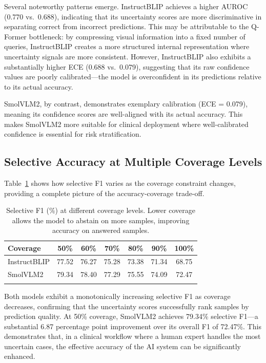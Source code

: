 \documentclass[pdflatex,sn-mathphys-num]{sn-jnl}
\begin{document}
Several noteworthy patterns emerge. InstructBLIP achieves a higher AUROC (0.770 vs.\ 0.688), indicating that its uncertainty scores are more discriminative in separating correct from incorrect predictions. This may be attributable to the Q-Former bottleneck: by compressing visual information into a fixed number of queries, InstructBLIP creates a more structured internal representation where uncertainty signals are more consistent. However, InstructBLIP also exhibits a substantially higher ECE (0.688 vs.\ 0.079), suggesting that its raw confidence values are poorly calibrated---the model is overconfident in its predictions relative to its actual accuracy.

SmolVLM2, by contrast, demonstrates exemplary calibration (ECE = 0.079), meaning its confidence scores are well-aligned with its actual accuracy. This makes SmolVLM2 more suitable for clinical deployment where well-calibrated confidence is essential for risk stratification.

\subsection{Selective Accuracy at Multiple Coverage Levels}

Table~\ref{tab:selective_coverage} shows how selective F1 varies as the coverage constraint changes, providing a complete picture of the accuracy-coverage trade-off.

\begin{table}[t]
\caption{Selective F1 (\%) at different coverage levels. Lower coverage allows the model to abstain on more samples, improving accuracy on answered samples.}\label{tab:selective_coverage}
\begin{tabular*}{\textwidth}{@{\extracolsep\fill}lcccccc}
\toprule
\textbf{Coverage} & \textbf{50\%} & \textbf{60\%} & \textbf{70\%} & \textbf{80\%} & \textbf{90\%} & \textbf{100\%} \\
\midrule
InstructBLIP & 77.52 & 76.27 & 75.28 & 73.38 & 71.34 & 68.75 \\
SmolVLM2 & 79.34 & 78.40 & 77.29 & 75.55 & 74.09 & 72.47 \\
\botrule
\end{tabular*}
\end{table}

Both models exhibit a monotonically increasing selective F1 as coverage decreases, confirming that the uncertainty scores successfully rank samples by prediction quality. At 50\% coverage, SmolVLM2 achieves 79.34\% selective F1---a substantial 6.87 percentage point improvement over its overall F1 of 72.47\%. This demonstrates that, in a clinical workflow where a human expert handles the most uncertain cases, the effective accuracy of the AI system can be significantly enhanced.
\end{document}
